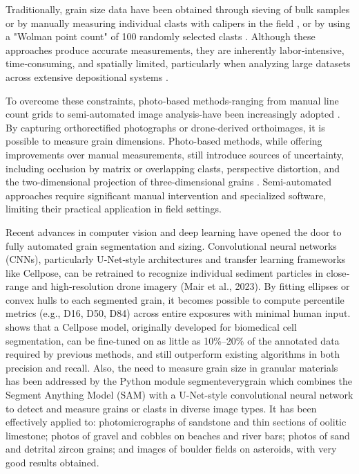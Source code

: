 \documentclass[final-report]{report-template}
\begin{document}
Traditionally, grain size data have been obtained through sieving of bulk samples or by manually measuring individual clasts with calipers in the field \citep{Bunte2001}, or by using a "Wolman point count" of 100 randomly selected clasts \citep{Wolman1954}. Although these approaches produce accurate measurements, they are inherently labor‐intensive, time‐consuming, and spatially limited,  particularly when analyzing large datasets across extensive depositional systems \citep{Duller2010}.

To overcome these constraints, photo‐based methods-ranging from manual line count grids to semi-automated image analysis-have been increasingly adopted \citep{Graham2010, Purinton2019}. By capturing orthorectified photographs or drone‐derived orthoimages, it is possible to measure grain dimensions. Photo-based methods, while offering improvements over manual measurements, still introduce sources of uncertainty, including occlusion by matrix or overlapping clasts, perspective distortion, and the two-dimensional projection of three-dimensional grains \citep{Garefalakis2023}. Semi-automated approaches require significant manual intervention and specialized software, limiting their practical application in field settings.

Recent advances in computer vision and deep learning have opened the door to fully automated grain segmentation and sizing. Convolutional neural networks (CNNs), particularly U‐Net‐style architectures and transfer learning frameworks like Cellpose, can be retrained to recognize individual sediment particles in close‐range and high‐resolution drone imagery (Mair et al., 2023). By fitting ellipses or convex hulls to each segmented grain, it becomes possible to compute percentile metrics (e.g., D16, D50, D84) across entire exposures with minimal human input. \cite{Mair2023} shows that a Cellpose model, originally developed for biomedical cell segmentation, can be fine‐tuned on as little as 10\%–20\% of the annotated data required by previous methods, and still outperform existing algorithms in both precision and recall. Also, the need to measure grain size in granular materials has been addressed by the Python module segmenteverygrain \citep{Sylvester2025} which combines the Segment Anything Model (SAM) with a U-Net-style convolutional neural network to detect and measure grains or clasts in diverse image types.  It has been effectively applied to: photomicrographs of sandstone and thin sections of oolitic limestone; photos of gravel and cobbles on beaches and river bars; photos of sand and detrital zircon grains; and images of boulder fields on asteroids, with very good results obtained.
\end{document}
